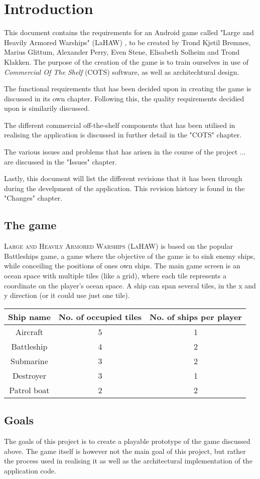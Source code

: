 \chapter{Introduction}
This document contains the requirements for an Android game called "Large and Heavily Armored Warships" (LaHAW) , to be created by Trond Kjetil Bremnes, Marius Glittum, Alexander Perry, Even Stene, Elisabeth Solheim and Trond Klakken. The purpose of the creation of the game is to train ourselves in use of \emph{Commercial Of The Shelf} (COTS) software, as well as architechtural design.

The functional requirements that has been decided upon in creating the game is discussed in its own chapter. Following this, the quality requirements decidied upon is similarily discussed.

The different commercial off-the-shelf components that has been utilised in realising the application is discussed in further detail in the "COTS" chapter.

The various issues and problems that has arisen in the course of the project ...
are discussed in the "Issues" chapter.

Lastly, this document will list the different revisions that it has been through during the develpment of the application. This revision history is found in the "Changes" chapter.



\section{The game}
\textsc{Large and Heavily Armored Warships (LaHAW)} is based on the popular Battleships\cite{battleship} game, a game where the objective of the game is to sink enemy ships, while conceiling the positions of ones own ships. The main game screen is an ocean space with multiple tiles (like a grid), where each tile represents a coordinate on the player's ocean space. A ship can span several tiles, in the x and y direction (or it could use just one tile). 
\\


\begin{tabular}{| c | c | c |}
    \hline
    \rowcolor[gray]{0.8}
    \hspace{0.3cm}\textbf{Ship name}\hspace{0.3cm} & \textbf{No. of occupied tiles} & \textbf{No. of ships per player} \\
    \hline
    Aircraft & 5 & 1 \\
    Battleship & 4 & 2 \\
    Submarine & 3 & 2 \\
    Destroyer & 3 & 1 \\
    Patrol boat & 2 & 2 \\
    \hline
\end{tabular}
\label{shiptable}





\section{Goals}
The goals of this project is to create a playable prototype of the game discussed above. The game itself is however not the main goal of this project, but rather the process used in realising it as well as the architectural implementation of the application code.
